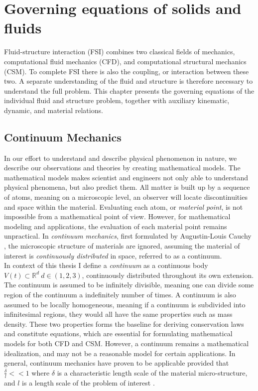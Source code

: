 \chapter{Governing equations of solids and fluids}
Fluid-structure interaction (FSI) combines two classical fields of mechanics, computational fluid mechanics (CFD), and computational structural mechanics (CSM). To complete FSI there is also the coupling, or interaction between these two. A separate understanding of the fluid and structure is therefore necessary to understand the full problem. This chapter presents the governing equations of the individual fluid and structure problem, together with auxiliary kinematic, dynamic, and material relations.

\section{Continuum Mechanics}
In our effort to understand and describe physical phenomenon in nature, we describe our observations and theories by creating mathematical models. The mathematical models makes scientist and engineers not only able to understand physical phenomena, but also predict them. All matter is built up by a sequence of atoms, meaning on a microscopic level, an observer will locate discontinuities and space within the material. Evaluating each atom, or \textit{material point}, is not impossible from a mathematical point of view. However, for mathematical modeling and applications, the evaluation of each material point remains unpractical. In \textit{continuum mechanics}, first formulated by Augustin-Louis Cauchy \cite{Merodio2011}, the microscopic structure of materials are ignored, assuming the material of interest is \textit{continuously distributed} in space, referred to as a continuum. \\

In context of this thesis I define a \textit{continuum} as a continuous body $V(t) \subset \mathbb{R}^d \ d \in (1, 2, 3)$, continuously distributed throughout its own extension. The continuum is assumed to be infinitely divisible, meaning one can divide some region of the continuum a indefinitely number of times. A continuum is also assumed to be locally homogeneous, meaning if a continuum is subdivided into infinitesimal regions, they would all have the same properties such as mass density. These two properties forms the baseline for deriving conservation laws and constitute equations, which are essential for formulating mathematical models for both CFD and CSM. However, a continuum remains a mathematical idealization, and may not be a reasonable model for certain applications. In general, continuum mechanics have proven to be applicable provided that $\frac{\delta}{l} << 1$ where $\delta$ is a characteristic length scale of the material micro-structure, and $l$ is a length scale of the problem of interest \cite{Humphrey2002}.

